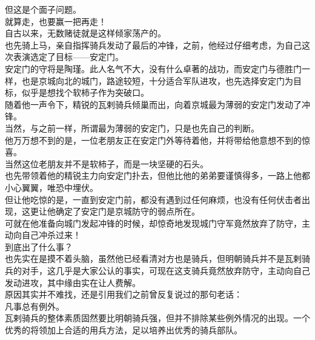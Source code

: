 \begin{multicols}{\theparacolNo}
但这是个面子问题。\\

就算走，也要赢一把再走！\\

自古以来，无数赌徒就是这样倾家荡产的。\\

也先骑上马，亲自指挥骑兵发动了最后的冲锋，之前，他经过仔细考虑，为自己这次表演选定了目标——安定门。\\

安定门的守将是陶瑾。此人名气不大，没有什么卓著的战功，而安定门与德胜门一样，也是京城向北的城门，路途较短，十分适合军队进攻，也先选择安定门为目标，似乎是想找个软柿子作为突破口。\\

随着他一声令下，精锐的瓦剌骑兵倾巢而出，向着京城最为薄弱的安定门发动了冲锋。\\

当然，与之前一样，所谓最为薄弱的安定门，只是也先自己的判断。\\

他万万想不到的是，一位老朋友正在安定门外等待着他，并将带给他意想不到的惊喜。\\

当然这位老朋友并不是软柿子，而是一块坚硬的石头。\\

也先带领着他的精锐主力向安定门扑去，但他比他的弟弟要谨慎得多，一路上他都小心翼翼，唯恐中埋伏。\\

但让他吃惊的是，一直到安定门前，都没有遇到过任何麻烦，也没有任何伏击者出现，这更让他确定了安定门是京城防守的弱点所在。\\

可就在他准备向城门发起冲锋的时候，却惊奇地发现城门守军竟然放弃了防守，主动向自己冲杀过来！\\

到底出了什么事？\\

也先实在是摸不着头脑，虽然他已经看清对方也是骑兵，但明朝骑兵并不是瓦剌骑兵的对手，这几乎是大家公认的事实，可现在这支骑兵竟然放弃防守，主动向自己发动进攻，其中缘由实在让人费解。\\

原因其实并不难找，还是引用我们之前曾反复说过的那句老话：\\

凡事总有例外。\\

瓦剌骑兵的整体素质固然要比明朝骑兵强，但并不排除某些例外情况的出现。一个优秀的将领加上合适的用兵方法，足以培养出优秀的骑兵部队。\\


\end{multicols}
